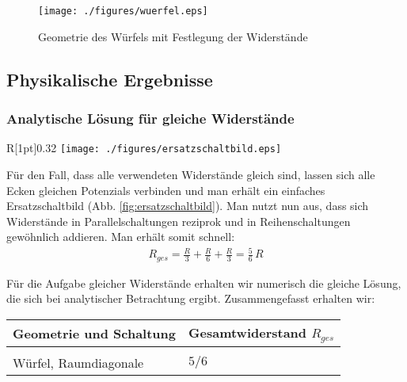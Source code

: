 \documentclass[10pt,a4paper]{article}
\begin{document}
\begin{figure}[htbp!]
\centering
\texttt{[image: ./figures/wuerfel.eps]}
\caption{Geometrie des Würfels mit Festlegung der Widerstände}
\label{fig:geometrie_wuerfel}
\end{figure}

\subsection{Physikalische Ergebnisse}

\subsubsection{Analytische Lösung für gleiche Widerstände}
\label{auswertung}
\begin{wrapfigure}[19]{R}[1pt]{0.32\textwidth}
\centering
\texttt{[image: ./figures/ersatzschaltbild.eps]}
\caption{Schaltbild für gleiche Widerstände $R$}
\label{fig:ersatzschaltbild}
\end{wrapfigure}
Für den Fall, dass alle verwendeten Widerstände gleich sind, lassen sich alle Ecken gleichen Potenzials verbinden und man erhält ein einfaches Ersatzschaltbild (Abb. \ref{fig:ersatzschaltbild}). Man nutzt nun aus, dass sich Widerstände in Parallelschaltungen reziprok und in Reihenschaltungen gewöhnlich addieren. Man erhält somit schnell:
\begin{align}
R_{ges}=\frac{R}{3}+\frac{R}{6}+\frac{R}{3}=\frac{5}{6}\,R
\end{align}

Für die Aufgabe gleicher Widerstände erhalten wir numerisch die gleiche Lösung, die sich bei analytischer Betrachtung ergibt. Zusammengefasst erhalten wir:
\begin{table}[htbp!]
\centering
\begin{tabular}{l|l}
Geometrie und Schaltung & Gesamtwiderstand $R_{ges}$\\\hline
\\
Würfel, Raumdiagonale & $5/6$
\end{tabular}
\end{table}
\end{document}
